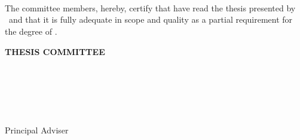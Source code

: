 %
%
%
%
%

\begin{center}\large
    \textbf{\schoolName}\\
    \textbf{\schoolCampus}\\
    \textbf{\schoolDepartment}\\
\end{center}

The  committee  members,  hereby,  certify  that  have  read  the  
thesis  presented  by \authorName\ and that it is fully 
adequate in scope and quality as a partial 
requirement  for  the  degree  of  \schoolProgram.

\begin{center}
\end{center}

\begin{center}
        \textbf{THESIS COMMITTEE}
\end{center}


\begin{flushright}
        \vspace{1cm}
        \underline{\hspace{8cm}} \\ 
        \MakeUppercase{\firstAdvisorName} \\
        \firstAdvisorSchoolName \\
        \firstAdvisorSchoolDepartment \\
        \firstAdvisorSchoolPlace \\
        Principal Adviser \\
\end{flushright}

